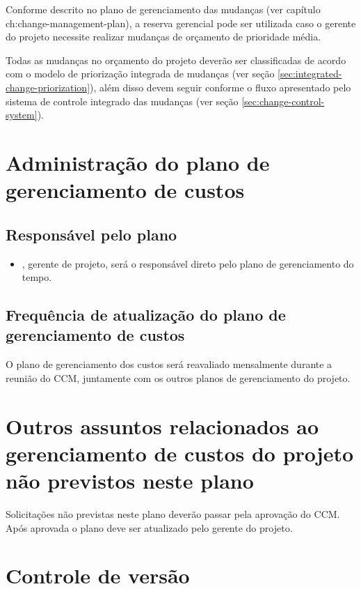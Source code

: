 Conforme descrito no plano de gerenciamento das mudanças (ver capítulo ch:change-management-plan), a reserva gerencial pode ser utilizada caso o gerente do projeto necessite realizar mudanças de orçamento de prioridade média.

Todas as mudanças no orçamento do projeto deverão ser classificadas de acordo com o modelo de priorização integrada de mudanças (ver seção \ref{sec:integrated-change-priorization}), além disso devem seguir conforme o fluxo apresentado pelo sistema de controle integrado das mudanças (ver seção \ref{sec:change-control-system}).

\section{Administração do plano de gerenciamento de custos}

\subsection{Responsável pelo plano}

\begin{itemize}
	\item \projectManagerName{}, gerente de projeto, será o responsável direto pelo plano de gerenciamento do tempo.
\end{itemize}

\subsection{Frequência de atualização do plano de gerenciamento de custos}

O plano de gerenciamento dos custos será reavaliado mensalmente durante a reunião do CCM, juntamente com os outros planos de gerenciamento do projeto.

\section{Outros assuntos relacionados ao gerenciamento de custos do projeto não previstos neste plano}

Solicitações não previstas neste plano deverão passar pela aprovação do CCM. Após aprovada o plano deve ser atualizado pelo gerente do projeto.

\section{Controle de versão}

